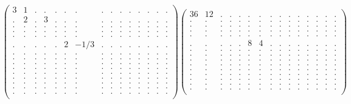 \documentclass[12pt,a4paper]{amsart}
\begin{document}
\begin{align*}
\left(\begin{array}{rrrrrrrrrrrrrrr}%
3&1&.&.&.&.&.&.&.&.&.&.&.&.&.\\%
.&2&.&3&.&.&.&.&.&.&.&.&.&.&.\\%
.&.&.&.&.&.&.&.&.&.&.&.&.&.&.\\%
.&.&.&.&.&.&.&.&.&.&.&.&.&.&.\\%
.&.&.&.&.&.&.&.&.&.&.&.&.&.&.\\%
.&.&.&.&.&2&-1/3&.&.&.&.&.&.&.&.\\%
.&.&.&.&.&.&.&.&.&.&.&.&.&.&.\\%
.&.&.&.&.&.&.&.&.&.&.&.&.&.&.\\%
.&.&.&.&.&.&.&.&.&.&.&.&.&.&.\\%
.&.&.&.&.&.&.&.&.&.&.&.&.&.&.\\%
.&.&.&.&.&.&.&.&.&.&.&.&.&.&.\\%
.&.&.&.&.&.&.&.&.&.&.&.&.&.&.\\%
.&.&.&.&.&.&.&.&.&.&.&.&.&.&.\\%
.&.&.&.&.&.&.&.&.&.&.&.&.&.&.\\%
.&.&.&.&.&.&.&.&.&.&.&.&.&.&.\\%
\end{array}\right)%
\left(\begin{array}{rrrrrrrrrrrrrrr}%
36&12&.&.&.&.&.&.&.&.&.&.&.&.&.\\%
.&.&.&.&.&.&.&.&.&.&.&.&.&.&.\\%
.&.&.&.&.&.&.&.&.&.&.&.&.&.&.\\%
.&.&.&.&.&.&.&.&.&.&.&.&.&.&.\\%
.&.&.&.&.&.&.&.&.&.&.&.&.&.&.\\%
.&.&.&.&.&8&4&.&.&.&.&.&.&.&.\\%
.&.&.&.&.&.&.&.&.&.&.&.&.&.&.\\%
.&.&.&.&.&.&.&.&.&.&.&.&.&.&.\\%
.&.&.&.&.&.&.&.&.&.&.&.&.&.&.\\%
.&.&.&.&.&.&.&.&.&.&.&.&.&.&.\\%
.&.&.&.&.&.&.&.&.&.&.&.&.&.&.\\%
.&.&.&.&.&.&.&.&.&.&.&.&.&.&.\\%
.&.&.&.&.&.&.&.&.&.&.&.&.&.&.\\%
.&.&.&.&.&.&.&.&.&.&.&.&.&.&.\\%
.&.&.&.&.&.&.&.&.&.&.&.&.&.&.\\%
\end{array}\right)%
\end{align*}
\end{document}
